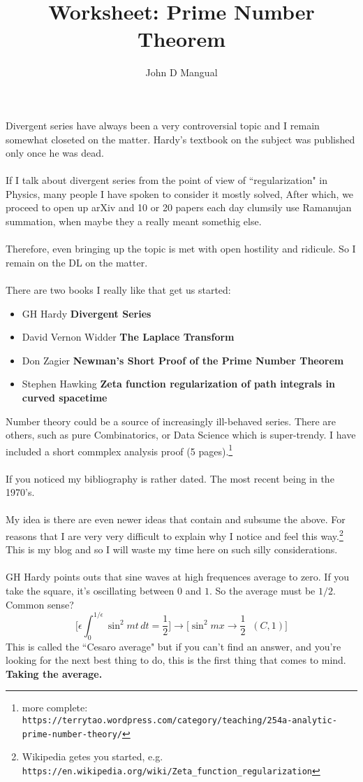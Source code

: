 \documentclass[12pt]{article}
\title{Worksheet: Prime Number Theorem}
\author{John D Mangual}
\date{}
\begin{document}
\selectfont \fontsize{12.5}{15}\selectfont

\maketitle

\noindent Divergent series have always been a very controversial topic and I remain somewhat closeted on the matter.  Hardy's textbook on the subject was published only once he was dead. \\ \\
If I talk about divergent series from the point of view of ``regularization" in Physics, many people I have spoken to consider it mostly solved,  After which, we proceed to open up arXiv and 10 or 20 papers each day clumsily use Ramanujan summation, when maybe they a really meant somethig else.  \\ \\
Therefore, even bringing up the topic is met with open hostility and ridicule.  So I remain on the DL on the  matter. \\ \\
There are two books I really like that get us started:
\begin{itemize}
\item GH Hardy \textbf{Divergent Series}
\item David Vernon Widder \textbf{The Laplace Transform}
\item Don Zagier \textbf{Newman's Short Proof of the Prime Number Theorem}
\item Stephen Hawking \textbf{Zeta function regularization of path integrals in curved spacetime}
\end{itemize}
Number theory could be a source of increasingly ill-behaved series.  There are others, such as pure Combinatorics, or Data Science which is super-trendy.  I have included a short commplex analysis proof (5 pages).\footnote{more complete: \texttt{https://terrytao.wordpress.com/category/teaching/254a-analytic-prime-number-theory/}}  \\ \\
If you noticed my bibliography is rather dated.  The most recent being in the 1970's. \\ \\
My idea is there are even newer ideas that contain and subsume the above.  For reasons that I are very very difficult to explain why I notice and feel this way.\footnote{Wikipedia getes you started, e.g. \texttt{https://en.wikipedia.org/wiki/Zeta\_{}function\_{}regularization}}  This is my blog and so I will waste my time here on such silly considerations. \\ \\
GH Hardy points outs that sine waves at high frequences average to zero.  If you take the square, it's oscillating between $0$ and $1$.  So the average must be $1/2$.  Common sense?
$$   \Bigg[ \epsilon \int_0^{1/\epsilon} \sin^2 mt \, dt =  \frac{1}{2} \Bigg]
\to \Bigg[ \sin^2 mx \to \frac{1}{2} \;\; (C,1) \Bigg]  $$ 
This is called the ``Cesaro average" but if you can't find an answer, and you're looking for the next best thing to do, this is the first thing that comes to mind.  \textbf{Taking the average.}
\end{document}
